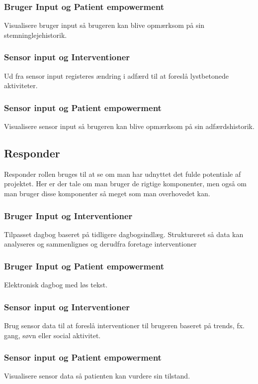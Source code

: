 \subsubsection*{Bruger Input og Patient empowerment}
Visualisere bruger input så brugeren kan blive opmærksom på sin stemninglejehistorik.
\subsubsection*{Sensor input og Interventioner} 
Ud fra sensor input registeres ændring i adfærd til at foreslå lystbetonede aktiviteter.
\subsubsection*{Sensor input og Patient empowerment}
Visualisere sensor input så brugeren kan blive opmærksom på sin adfærdshistorik.

\subsection{Responder}
Responder rollen bruges til at se om man har udnyttet det fulde potentiale af projektet.
Her er der tale om man bruger de rigtige komponenter, men også om man bruger disse komponenter så meget som man overhovedet kan. 

\subsubsection*{Bruger Input og Interventioner}
Tilpasset dagbog baseret på tidligere dagbogsindlæg.
Struktureret så data kan analyseres og sammenlignes og derudfra foretage interventioner
\subsubsection*{Bruger Input og Patient empowerment}
Elektronisk dagbog med løs tekst.
\subsubsection*{Sensor input og Interventioner} 
Brug sensor data til at foreslå interventioner til brugeren baseret på trends, fx. gang, søvn eller social aktivitet.
\subsubsection*{Sensor input og Patient empowerment}
Visualisere sensor data så patienten kan vurdere sin tilstand.


